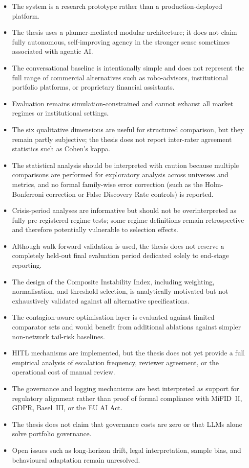 \documentclass[11pt]{article}
\begin{document}
\begin{itemize}
  \item The system is a research prototype rather than a production-deployed platform.
  \item The thesis uses a planner-mediated modular architecture; it does not claim fully autonomous, self-improving agency in the stronger sense sometimes associated with agentic AI.
  \item The conversational baseline is intentionally simple and does not represent the full range of commercial alternatives such as robo-advisors, institutional portfolio platforms, or proprietary financial assistants.
  \item Evaluation remains simulation-constrained and cannot exhaust all market regimes or institutional settings.
  \item The six qualitative dimensions are useful for structured comparison, but they remain partly subjective; the thesis does not report inter-rater agreement statistics such as Cohen's kappa.
  \item The statistical analysis should be interpreted with caution because multiple comparisons are performed for exploratory analysis across universes and metrics, and no formal family-wise error correction (such as the Holm-Bonferroni correction or False Discovery Rate controls) is reported.
  \item Crisis-period analyses are informative but should not be overinterpreted as fully pre-registered regime tests; some regime definitions remain retrospective and therefore potentially vulnerable to selection effects.
  \item Although walk-forward validation is used, the thesis does not reserve a completely held-out final evaluation period dedicated solely to end-stage reporting.
  \item The design of the Composite Instability Index, including weighting, normalisation, and threshold selection, is analytically motivated but not exhaustively validated against all alternative specifications.
  \item The contagion-aware optimisation layer is evaluated against limited comparator sets and would benefit from additional ablations against simpler non-network tail-risk baselines.
  \item HITL mechanisms are implemented, but the thesis does not yet provide a full empirical analysis of escalation frequency, reviewer agreement, or the operational cost of manual review.
  \item The governance and logging mechanisms are best interpreted as support for regulatory alignment rather than proof of formal compliance with MiFID~II, GDPR, Basel~III, or the EU AI Act.
  \item The thesis does not claim that governance costs are zero or that LLMs alone solve portfolio governance.
  \item Open issues such as long-horizon drift, legal interpretation, sample bias, and behavioural adaptation remain unresolved.
\end{itemize}
\end{document}

